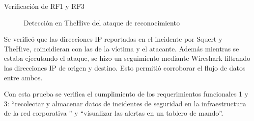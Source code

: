 \begin{section}{Verificación de RF1 y RF3}
\begin{figure}[H]
        \caption{Detección en TheHive del ataque de reconocimiento}
        \label{fig:thehive-nmap}
    \end{figure}
    \FloatBarrier
    Se verificó que las direcciones IP reportadas en el incidente por Squert y TheHive, coincidieran con las de la víctima y el atacante. Además mientras se estaba ejecutando el ataque, se hizo un seguimiento mediante Wireshark \cite{wireshark} filtrando las direcciones IP de origen y destino. Esto permitió corroborar el flujo de datos entre ambos.\par
    Con esta prueba se verifica el cumplimiento de los requerimientos funcionales 1 y 3: “recolectar y almacenar datos de incidentes de seguridad en la infraestructura de la red corporativa ” y “visualizar las alertas en un tablero de mando”.\par

    \end{section} 
    
